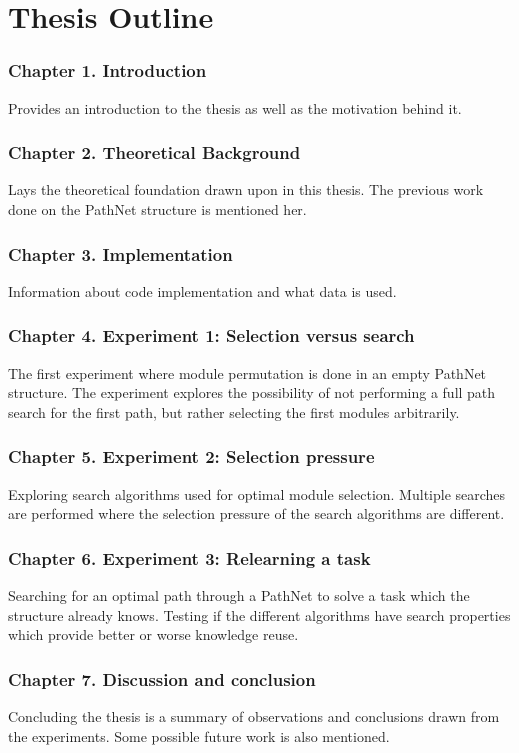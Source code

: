 \section{Thesis Outline}
\subsubsection{Chapter 1. Introduction}
Provides an introduction to the thesis as well as the motivation behind it.
\subsubsection{Chapter 2. Theoretical Background}
Lays the theoretical foundation drawn upon in this thesis. The previous work done on the PathNet structure is mentioned her.
\subsubsection{Chapter 3. Implementation}
Information about code implementation and what data is used.
\subsubsection{Chapter 4. Experiment 1: Selection versus search}
The first experiment where module permutation is done in an empty PathNet structure. The experiment explores the possibility of not performing a full path search for the first path, but rather selecting the first modules arbitrarily.
\subsubsection{Chapter 5. Experiment 2: Selection pressure}
Exploring search algorithms used for optimal module selection. Multiple searches are performed where the selection pressure of the search algorithms are different. 
\subsubsection{Chapter 6. Experiment 3: Relearning a task}
Searching for an optimal path through a PathNet to solve a task which the structure already knows. Testing if the different algorithms have search properties which provide better or worse knowledge reuse.
\subsubsection{Chapter 7. Discussion and conclusion}
Concluding the thesis is a summary of observations and conclusions drawn from the experiments. Some possible future work is also mentioned.



